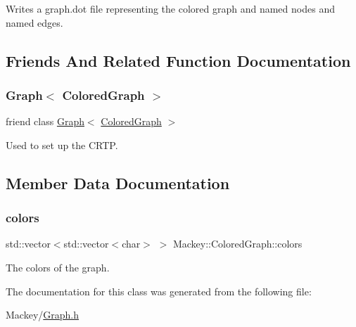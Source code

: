 Writes a graph.\+dot file representing the colored graph and named nodes and named edges. 



\subsection{Friends And Related Function Documentation}
\mbox{\label{classMackey_1_1ColoredGraph_a2debfc8158c19d7b93550156a3e2676a}} 
\subsubsection{\texorpdfstring{Graph$<$ Colored\+Graph $>$}{Graph< ColoredGraph >}}
{\footnotesize\ttfamily friend class \hyperlink{classMackey_1_1Graph}{Graph}$<$ \hyperlink{classMackey_1_1ColoredGraph}{Colored\+Graph} $>$\hspace{0.3cm}{\ttfamily [friend]}}



Used to set up the C\+R\+TP. 



\subsection{Member Data Documentation}
\mbox{\label{classMackey_1_1ColoredGraph_a29fbdcaf9f94f0f5d48e5390ba49b338}} 
\subsubsection{\texorpdfstring{colors}{colors}}
{\footnotesize\ttfamily std\+::vector$<$std\+::vector$<$char$>$ $>$ Mackey\+::\+Colored\+Graph\+::colors}



The colors of the graph. 



The documentation for this class was generated from the following file\+:\begin{DoxyCompactItemize}
\item 
Mackey/\hyperlink{Graph_8h}{Graph.\+h}\end{DoxyCompactItemize}
